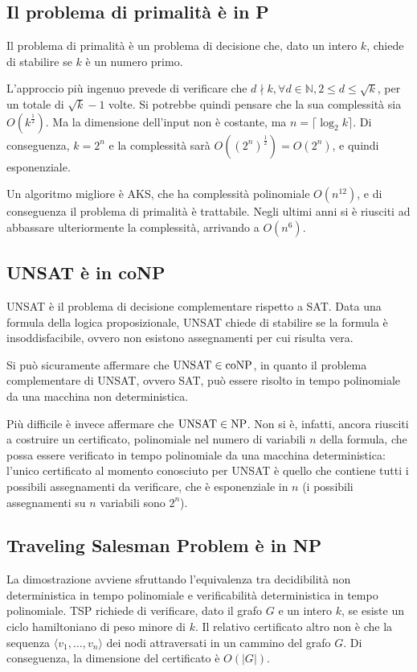 \subsection*{Il problema di primalità è in P}
Il problema di primalità è un problema di decisione che, dato un intero $k$, chiede di stabilire se $k$ è un numero primo.

L'approccio più ingenuo prevede di verificare che $d \nmid k, \forall d \in \mathbb{N}, 2 \le d \le \sqrt{k}$, per un totale di $\sqrt{k} - 1$ volte.
Si potrebbe quindi pensare che la sua complessità sia $O(k^{\frac{1}{2}})$. Ma la dimensione dell'input non è costante, ma $n = \lceil \log_2 k \rceil$.
Di conseguenza, $k = 2^n$ e la complessità sarà $O({(2^n)}^\frac{1}{2}) = O(2^n)$, e quindi esponenziale.

Un algoritmo migliore è AKS, che ha complessità polinomiale $O(n^12)$, e di conseguenza il problema di primalità è trattabile.
Negli ultimi anni si è riusciti ad abbassare ulteriormente la complessità, arrivando a $O(n^6)$.

\subsection*{UNSAT è in coNP}
UNSAT è il problema di decisione complementare rispetto a SAT.
Data una formula della logica proposizionale, UNSAT chiede di stabilire se la formula è insoddisfacibile, ovvero non esistono assegnamenti per cui risulta vera.

Si può sicuramente affermare che $\textnormal{UNSAT} \in \textnormal{coNP}$, in quanto il problema complementare di UNSAT, ovvero SAT, può essere risolto in tempo polinomiale da una macchina non deterministica.

Più difficile è invece affermare che $\textnormal{UNSAT} \in \textnormal{NP}$. Non si è, infatti, ancora riusciti a costruire un certificato, polinomiale nel numero di variabili $n$ della formula, che possa essere verificato in tempo polinomiale da una macchina deterministica: l'unico certificato al momento conosciuto per UNSAT è quello che contiene tutti i possibili assegnamenti da verificare, che è esponenziale in $n$ (i possibili assegnamenti su $n$ variabili sono $2^n$).

\subsection*{Traveling Salesman Problem è in NP}
La dimostrazione avviene sfruttando l'equivalenza tra decidibilità non deterministica in tempo polinomiale e verificabilità deterministica in tempo polinomiale.
TSP richiede di verificare, dato il grafo $G$ e un intero $k$, se esiste un ciclo hamiltoniano di peso minore di $k$.
Il relativo certificato altro non è che la sequenza $\langle v_1, \ldots, v_n \rangle$ dei nodi attraversati in un cammino del grafo $G$.
Di conseguenza, la dimensione del certificato è $O(|G|)$.

